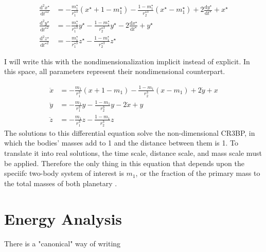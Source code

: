 \documentclass{article}
\newcommand{\dd}[2]{\frac{\mathrm{d}#1}{\mathrm{d}#2}}
\begin{document}
\[\begin{aligned}
    \dd{^2x^\star}{t^{\star2}}&=-\frac{m_1^\star}{r_1^{\star3}}(x^\star+1-m_1^\star)-\frac{1-m_1^\star}{r_2^{\star3}}(x^\star-m_1^\star)+2\dd{y^\star}{t^\star}+x^\star\\
    \dd{^2y^\star}{t^{\star2}}&=-\frac{m_1^\star}{r_1^{\star3}}y^\star-\frac{1-m_1^\star}{r_2^{\star3}}y^\star-2\dd{x^\star}{t^\star}+y^\star\\
    \dd{^2z^\star}{t^{\star2}}&=-\frac{m_1^\star}{r_1^{\star3}}z^\star-\frac{1-m_1^\star}{r_2^{\star3}}z^\star
\end{aligned}\]

I will write this with the nondimensionalization implicit instead of explicit. In this space, all parameters represent their nondimensional counterpart.

\[\boxed{\begin{aligned}
    \ddot{x}&=-\frac{m_1}{r_1^3}(x+1-m_1)-\frac{1-m_1}{r_2^3}(x-m_1)+2\dot{y}+x\\
    \ddot{y}&=-\frac{m_1}{r_1^3}y-\frac{1-m_1}{r_2^3}y-2\dot{x}+y\\
    \ddot{z}&=-\frac{m_1}{r_1^3}z-\frac{1-m_1}{r_2^3}z
\end{aligned}}\]
The solutions to this differential equation solve the non-dimensional CR3BP, in which the bodies' masses add to 1 and the distance between them is 1. To translate it into real solutions, the time scale, distance scale, and mass scale must be applied. Therefore the only thing in this equation that depends upon the speciifc two-body system of interest is $m_1$, or the fraction of the primary mass to the total masses of both planetary .

\section*{Energy Analysis}

There is a "canonical" way of writing 
\end{document}
